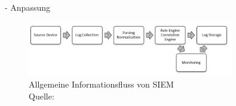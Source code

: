 - Anpassung %

\begin{figure}[H]
   \centering
   \includegraphics[width=0.8\textwidth]{assets/2_p2.png}
   \caption{Allgemeine Informationsfluss von \gls{SIEM} \\Quelle: \citep{Granadillo_SIEM} }
   \centering
\end{figure}







